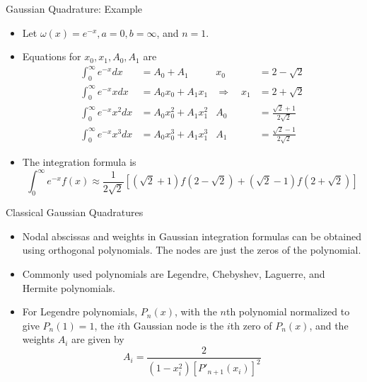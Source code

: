 \documentclass{beamer}
\newcommand{\beforeverb}{\footnotesize}
\newcommand{\afterverb}{\normalsize}
\begin{document}
\begin{frame}{Gaussian Quadrature: Example}
\begin{itemize}
\item Let $\omega(x)=e^{-x}, a=0, b=\infty$, and $n=1$. 
\item Equations for $x_0, x_1, A_0, A_1$ are
\beforeverb
\begin{align*}
\int_0^\infty e^{-x} dx&=A_0+A_1 &  x_0&= 2-\sqrt{2}  \\
\int_0^\infty e^{-x} x dx&=A_0 x_0 +A_1 x_1 &\Rightarrow \quad x_1&=2+\sqrt{2}\\
\int_0^\infty e^{-x} x^2 dx&=A_0 x_0^2+A_1 x_1^2 & A_0&=\frac{\sqrt{2}+1}{2\sqrt{2}}\\
\int_0^\infty e^{-x} x^3 dx&=A_0 x_0^3+A_1 x_1^3  &A_1&=\frac{\sqrt{2}-1}{2\sqrt{2}} 
\end{align*}
\afterverb
\item The integration formula is 
\beforeverb
\[
\int_0^\infty e^{-x} f(x) \approx \frac{1}{2\sqrt{2}} \left[(\sqrt{2}+1)f(2-\sqrt{2})+(\sqrt{2}-1)f(2+\sqrt{2})\right]
\]
\afterverb
\end{itemize}
\end{frame}
\begin{frame}{Classical Gaussian Quadratures}
\begin{itemize}
\item Nodal abscissas and weights in Gaussian integration formulas can be obtained using \alert{orthogonal polynomials}. The nodes are just the zeros of the polynomial.
\item Commonly used polynomials are Legendre, Chebyshev, Laguerre, and Hermite polynomials.
\item For Legendre polynomials, $P_n(x)$, with the $n$th polynomial normalized to give $P_n(1)=1$, the $i$th Gaussian node is the $i$th zero of $P_n(x)$, and the weights $A_i$ are given by
\beforeverb
\[
A_i=\frac{2}{(1-x_i^2)[P'_{n+1}(x_i)]^2}
\]
\afterverb
\end{itemize}
\end{frame}
\end{document}
